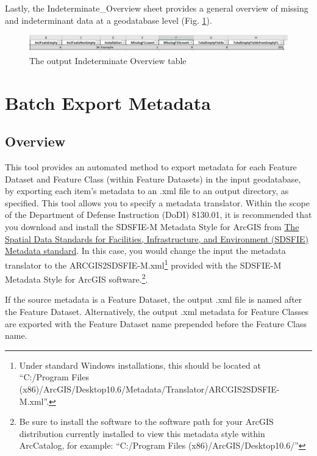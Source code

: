 \documentclass[openany]{book}
\let\rmarkdownfootnote\footnote%
\def\footnote{\protect\rmarkdownfootnote}
\theoremstyle{definition}
\theoremstyle{definition}
\theoremstyle{definition}
\theoremstyle{remark}
\begin{document}
Lastly, the Indeterminate\_Overview sheet provides a general overview of
missing and indeterminant data at a geodatabase level (Fig.
\ref{fig:summIndtsheet4}).

\begin{figure}[H]

{\centering \includegraphics[width=5.67in,]{figures/summIndt-sheet4} 

}

\caption{The output Indeterminate Overview table}\label{fig:summIndtsheet4}
\end{figure}

\hypertarget{exMeta}{\chapter{Batch Export Metadata}\label{exMeta}}

\section{Overview}\label{overview-10}

This tool provides an automated method to export metadata for each
Feature Dataset and Feature Class (within Feature Datasets) in the input
geodatabase, by exporting each item's metadata to an .xml file to an
output directory, as specified. This tool allows you to specify a
metadata translator. Within the scope of the Department of Defense
Instruction (DoDI) 8130.01, it is recommended that you download and
install the SDSFIE-M Metadata Style for ArcGIS from
\href{https://www.sdsfieonline.org/Standards/Metadata}{The Spatial Data
Standards for Facilities, Infrastructure, and Environment (SDSFIE)
Metadata standard}. In this case, you would change the input the
metadata translator to the ARCGIS2SDSFIE-M.xml\footnote{Under standard
  Windows installations, this should be located at ``C:/Program Files
  (x86)/ArcGIS/Desktop10.6/Metadata/Translator/ARCGIS2SDSFIE-M.xml''.}
provided with the SDSFIE-M Metadata Style for ArcGIS software.\footnote{Be
  sure to install the software to the software path for your ArcGIS
  distribution currently installed to view this metadata style within
  ArcCatalog, for example: ``C:/Program Files
  (x86)/ArcGIS/Desktop10.6/''}.

If the source metadata is a Feature Dataset, the output .xml file is
named after the Feature Dataset. Alternatively, the output .xml metadata
for Feature Classes are exported with the Feature Dataset name prepended
before the Feature Class name.
\end{document}
